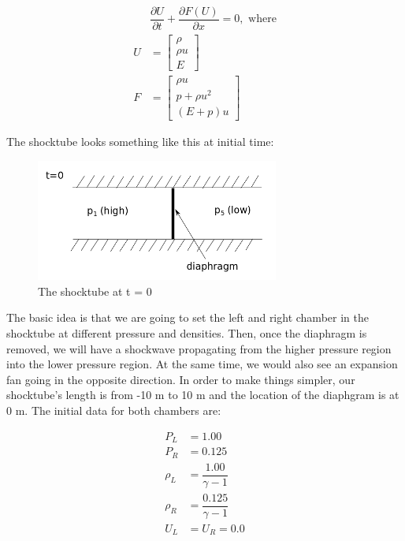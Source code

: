 \documentclass[12pt]{article}
\begin{document}
    \begin{equation}
        \begin{aligned}
            &\dfrac{\partial U}{\partial t} + \dfrac{\partial F(U)}{\partial x} = 0, \text{ where}\\
            U&= \begin{bmatrix}
                \rho\\
                \rho u \\
                E
            \end{bmatrix} \\
            F&= \begin{bmatrix}
                \rho u \\
                p + \rho u^2\\
                (E+p)u                
            \end{bmatrix}        
        \end{aligned}
    \end{equation}

    \newpage
    The shocktube looks something like this at initial time: 

    \begin{figure}[H]
        \begin{center}
        \includegraphics[height = 40mm,width = 80mm]{IC_sod.png}
        \caption{The shocktube at t = 0}
        \end{center}
    \end{figure}     

    \noindent
    The basic idea is that we are going to set the left and right chamber in the shocktube at different pressure and densities.  Then, once the diaphragm is removed, we will have a shockwave propagating from the higher pressure region into the lower pressure region.  At the same time, we would also see an expansion fan going in the opposite direction. In order to make things simpler, our shocktube's length is from -10 m to 10 m and the location of the diaphgram is at 0 m. The initial data for both chambers are:

    \begin{align*}
        P_L &= 1.00 \\
        P_R &= 0.125 \\
        \rho_L &= \dfrac{1.00}{\gamma -1} \\
        \rho_R &= \dfrac{0.125}{\gamma-1}\\
        U_L &= U_R = 0.0
    \end{align*}
\end{document}
